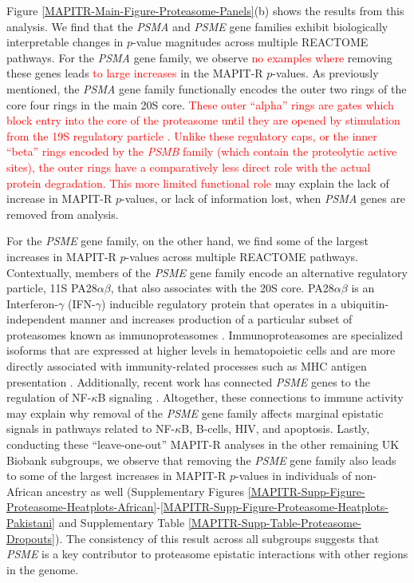 \documentclass[10pt]{article}
\begin{document}
Figure \ref{MAPITR-Main-Figure-Proteasome-Panels}(b) shows the results from this analysis. We find that the \textit{PSMA} and \textit{PSME} gene families exhibit biologically interpretable changes in $p$-value magnitudes across multiple REACTOME pathways. For the \textit{PSMA} gene family, we observe \textcolor{red}{no examples where} removing these genes leads \textcolor{red}{to large increases} in the MAPIT-R $p$-values. As previously mentioned, the \textit{PSMA} gene family functionally encodes the outer two rings of the core four rings in the main 20S core. \textcolor{red}{These outer ``alpha'' rings are gates which block entry into the core of the proteasome until they are opened by stimulation from the 19S regulatory particle \cite{Groll2000,Kohler2001,Smith2007}. Unlike these regulatory caps, or the inner ``beta'' rings encoded by the \textit{PSMB} family (which contain the proteolytic active sites), the outer rings have a comparatively less direct role with the actual protein degradation. This more limited functional role} may explain the lack of increase in MAPIT-R $p$-values, or lack of information lost, when \textit{PSMA} genes are removed from analysis. 
 
For the \textit{PSME} gene family, on the other hand, we find some of the largest increases in MAPIT-R $p$-values across multiple REACTOME pathways. Contextually, members of the \textit{PSME} gene family encode an alternative regulatory particle, 11S PA28$\alpha\beta$, that also associates with the 20S core. PA28$\alpha\beta$ is an Interferon-$\gamma$ (IFN-$\gamma$) inducible regulatory protein that operates in a ubiquitin-independent manner and increases production of a particular subset of proteasomes known as immunoproteasomes \cite{Groettrup1996,de2011,Raule2014,Murata2018}. Immunoproteasomes are specialized isoforms that are expressed at higher levels in hematopoietic cells and are more directly associated with immunity-related processes such as MHC antigen presentation \cite{Ferrington2012,Basler2013,McCarthy2015}. Additionally, recent work has connected \textit{PSME} genes to the regulation of NF-$\kappa$B signaling \cite{Sun2016,Mitchell2019}. Altogether, these connections to immune activity may explain why removal of the \textit{PSME} gene family affects marginal epistatic signals in pathways related to NF-$\kappa$B, B-cells, HIV, and apoptosis. Lastly, conducting these ``leave-one-out'' MAPIT-R analyses in the other remaining UK Biobank subgroups, we observe that removing the \textit{PSME} gene family also leads to some of the largest increases in MAPIT-R $p$-values in individuals of non-African ancestry as well (Supplementary Figures \ref{MAPITR-Supp-Figure-Proteasome-Heatplots-African}-\ref{MAPITR-Supp-Figure-Proteasome-Heatplots-Pakistani} and Supplementary Table \ref{MAPITR-Supp-Table-Proteasome-Dropouts}). The consistency of this result across all subgroups suggests that \textit{PSME} is a key contributor to proteasome epistatic interactions with other regions in the genome. 
\end{document}
